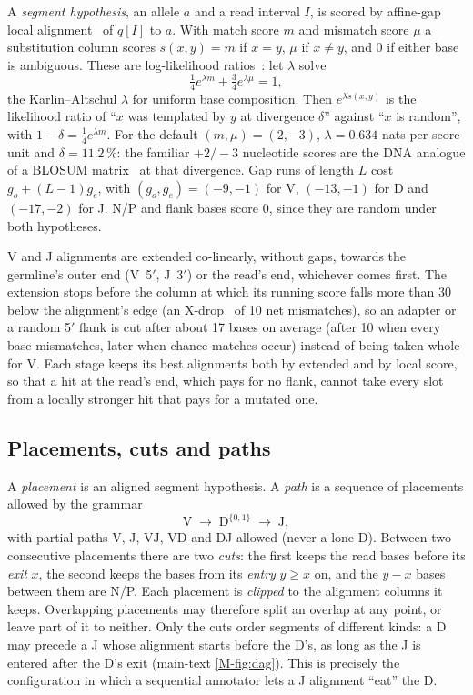 \documentclass[11pt,a4paper]{article}
\begin{document}
A \emph{segment hypothesis}, an allele $a$ and a read interval $I$, is scored
by affine-gap local alignment~\cite{smith1981,gotoh1982} of $q[I]$ to $a$.
With match score $m$ and mismatch score $\mu$ a substitution column scores
$s(x,y)=m$ if $x=y$, $\mu$ if $x\neq y$, and $0$ if either base is ambiguous.
These are log-likelihood ratios~\cite{altschul1991,karlin1990}: let $\lambda$
solve
\begin{equation}
  \tfrac14 e^{\lambda m} + \tfrac34 e^{\lambda\mu} = 1 ,
  \label{eq:lambda}
\end{equation}
the Karlin--Altschul $\lambda$ for uniform base composition. Then
$e^{\lambda s(x,y)}$ is the likelihood ratio of ``$x$ was templated by $y$ at
divergence $\delta$'' against ``$x$ is random'', with
$1-\delta=\tfrac14 e^{\lambda m}$. For the default $(m,\mu)=(2,-3)$,
$\lambda=0.634$ nats per score unit and $\delta=11.2\,\%$: the familiar
$+2/-3$ nucleotide scores are the DNA analogue of a BLOSUM
matrix~\cite{henikoff1992} at that divergence. Gap runs of length $L$ cost
$g_o+(L-1)g_e$, with $(g_o,g_e)=(-9,-1)$ for V, $(-13,-1)$ for D and $(-17,-2)$
for J. N/P and flank bases score 0, since they are random under both
hypotheses.

V and J alignments are extended co-linearly, without gaps, towards the
germline's outer end (V~5$'$, J~3$'$) or the read's end, whichever comes
first. The extension stops before the column at which its running score
falls more than 30 below the alignment's edge (an
X-drop~\cite{altschul1997gapped} of 10 net mismatches), so an adapter or a
random 5$'$ flank is cut after about 17 bases on average (after 10 when
every base mismatches, later when chance matches occur) instead of being
taken whole for V.
Each stage keeps its best alignments both by extended and by local score, so
that a hit at the read's end, which pays for no flank, cannot take every slot
from a locally stronger hit that pays for a mutated one.

\subsection{Placements, cuts and paths}
\label{sec:paths}

A \emph{placement} is an aligned segment hypothesis. A \emph{path} is a
sequence of placements allowed by the grammar
\begin{equation}
  \mathrm{V} \;\to\; \mathrm{D}^{\{0,1\}} \;\to\; \mathrm{J} ,
\end{equation}
with partial paths V, J, VJ, VD and DJ allowed (never a lone D). Between two
consecutive placements there are two \emph{cuts}: the first keeps the read
bases before its \emph{exit} $x$, the second keeps the bases from its
\emph{entry} $y\geq x$ on, and the $y-x$ bases between them are N/P. Each
placement is \emph{clipped} to the alignment columns it keeps. Overlapping
placements may therefore split an overlap at any point, or leave part of it
to neither. Only the cuts order segments of different kinds: a D may precede
a J whose alignment starts before the D's, as long as the J is entered after
the D's exit (main-text \cref{M-fig:dag}). This is precisely the configuration in which a
sequential annotator lets a J alignment ``eat'' the D.
\end{document}
